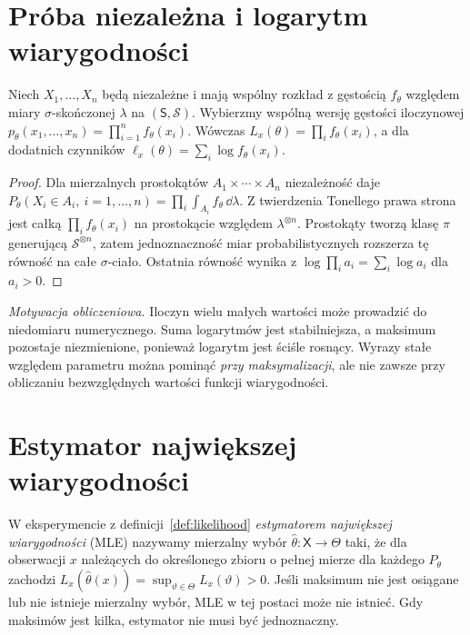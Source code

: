 \section{Próba niezależna i logarytm wiarygodności}
\begin{stwierdzenie}\label{prop:product-likelihood}
Niech $X_1,\ldots,X_n$ będą niezależne i mają wspólny rozkład z gęstością
$f_\theta$ względem miary $\sigma$-skończonej $\lambda$ na $(\mathsf S,\mathcal S)$.
Wybierzmy wspólną wersję gęstości iloczynowej
$p_\theta(x_1,\ldots,x_n)=\prod_{i=1}^nf_\theta(x_i)$.
Wówczas $L_x(\theta)=\prod_i f_\theta(x_i)$, a dla dodatnich czynników
$\ell_x(\theta)=\sum_i\log f_\theta(x_i)$.
\end{stwierdzenie}
\begin{proof}
Dla mierzalnych prostokątów $A_1\times\cdots\times A_n$ niezależność
daje $P_\theta(X_i\in A_i,\ i=1,\ldots,n)=\prod_i\int_{A_i}f_\theta\,\dd\lambda$.
Z twierdzenia Tonellego prawa strona jest całką $\prod_i f_\theta(x_i)$
na prostokącie względem $\lambda^{\otimes n}$. Prostokąty tworzą klasę
$\pi$ generującą \mbox{$\mathcal S^{\otimes n}$}, zatem jednoznaczność
miar probabilistycznych rozszerza tę równość na całe $\sigma$-ciało.
Ostatnia równość wynika z $\log\prod_i a_i=\sum_i\log a_i$ dla $a_i>0$.
\end{proof}

\emph{Motywacja obliczeniowa.} Iloczyn wielu małych wartości może prowadzić
do niedomiaru numerycznego. Suma logarytmów jest stabilniejsza, a maksimum
pozostaje niezmienione, ponieważ logarytm jest ściśle rosnący. Wyrazy
stałe względem parametru można pominąć \emph{przy maksymalizacji}, ale nie
zawsze przy obliczaniu bezwzględnych wartości funkcji wiarygodności.

\section{Estymator największej wiarygodności}
\begin{definicja}[MLE]\label{def:mle}
W eksperymencie z definicji~\ref{def:likelihood} \emph{estymatorem
największej wiarygodności} (MLE) nazywamy mierzalny wybór
$\widehat\theta:\mathsf X\to\Theta$ taki, że dla obserwacji $x$ należących
do określonego zbioru o pełnej mierze dla każdego $P_\theta$ zachodzi
$L_x(\widehat\theta(x))=\sup_{\vartheta\in\Theta}L_x(\vartheta)>0$.
Jeśli maksimum nie jest osiągane lub nie istnieje mierzalny wybór,
MLE w tej postaci może nie istnieć. Gdy maksimów jest kilka, estymator
nie musi być jednoznaczny.
\end{definicja}

